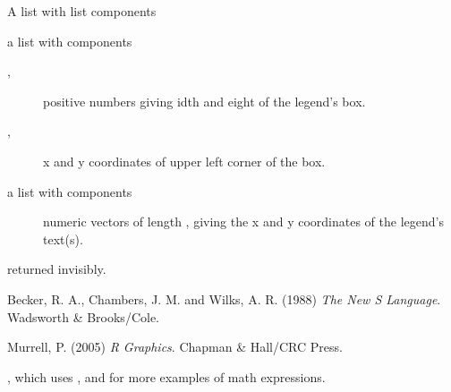 \begin{Value}
A list with list components
\begin{ldescription}
\item[\code{rect}] a list with components
\begin{description}

\item[, ] positive numbers giving idth and
eight of the legend's box.
\item[, ] x and y coordinates of upper left
corner of the box.

\end{description}


\item[\code{text}] a list with components
\begin{description}

\item[] numeric vectors of length ,
giving the x and y coordinates of the legend's text(s).

\end{description}


\end{ldescription}
returned invisibly.
\end{Value}
%
\begin{References}\relax
Becker, R. A., Chambers, J. M. and Wilks, A. R. (1988)
\emph{The New S Language}.
Wadsworth \& Brooks/Cole.

Murrell, P. (2005) \emph{R Graphics}. Chapman \& Hall/CRC Press.
\end{References}
%
\begin{SeeAlso}\relax
{},  which uses , and
 for more examples of math expressions.
\end{SeeAlso}
%
